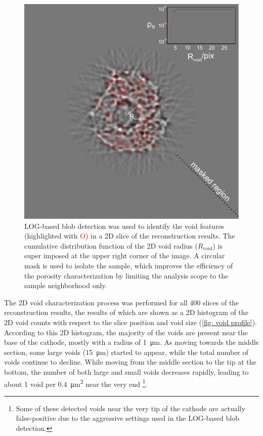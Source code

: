 \documentclass[12pt]{scrartcl}
\newcommand{\myscale}{1}
\begin{document}
\renewcommand{\myscale}{.5}
\begin{figure}
\centering
\includegraphics[scale=\myscale]{voidDetectionDemo_mid}
\caption{
LOG-based blob detection was used to identify the void features (highlighted with \textcolor{red}{O}) in a 2D slice of the reconstruction results.
The cumulative distribution function of the 2D void radius ($R_\text{void}$) is super imposed at the upper right corner of the image.
A circular mask is used to isolate the sample, which improves the efficiency of the porosity characterization by limiting the analysis scope to the sample neighborhood only.
}\label{fig: void detection demo}
\end{figure}

The 2D void characterization process was performed for all 400 slices of the reconstruction results, the results of which are shown as a 2D histogram of the 2D void counts with respect to the slice position and void size (\cref{fig: void profile}).
According to this 2D histogram, the majority of the voids are present near the base of the cathode, mostly with a radius of \SI{1}{\micro\meter}.
As moving towards the middle section, some large voids (\SI{15}{\micro\meter}) started to appear, while the total number of voids continue to decline.
While moving from the middle section to the tip at the bottom, the number of both large and small voids decreases rapidly, leading to about 1 void per \SI{0.4}{\square\micro\meter} near the very end%
\footnote{
Some of these detected voids near the very tip of the cathode are actually false-positive due to the aggressive settings used in the LOG-based blob detection.
}.
 
\end{document}
